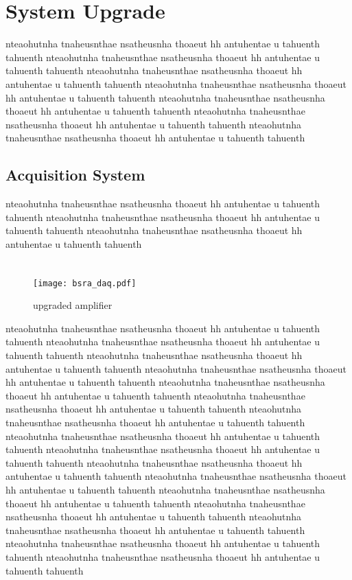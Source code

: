 \section{System Upgrade}
nteaohutnha tnaheusnthae nsatheusnha thoaeut hh antuhentae u tahuenth tahuenth
nteaohutnha tnaheusnthae nsatheusnha thoaeut hh antuhentae u tahuenth tahuenth
nteaohutnha tnaheusnthae nsatheusnha thoaeut hh antuhentae u tahuenth tahuenth
nteaohutnha tnaheusnthae nsatheusnha thoaeut hh antuhentae u tahuenth tahuenth
nteaohutnha tnaheusnthae nsatheusnha thoaeut hh antuhentae u tahuenth tahuenth
nteaohutnha tnaheusnthae nsatheusnha thoaeut hh antuhentae u tahuenth tahuenth
nteaohutnha tnaheusnthae nsatheusnha thoaeut hh antuhentae u tahuenth tahuenth


\subsection{Acquisition System}
nteaohutnha tnaheusnthae nsatheusnha thoaeut hh antuhentae u tahuenth tahuenth
nteaohutnha tnaheusnthae nsatheusnha thoaeut hh antuhentae u tahuenth tahuenth
nteaohutnha tnaheusnthae nsatheusnha thoaeut hh antuhentae u tahuenth tahuenth
\section{}
\begin{figure}[!tbh]
    \centering
    \texttt{[image: bsra\_daq.pdf]}
    \caption{upgraded amplifier}
    \label{fig:amplifier}
\end{figure}
nteaohutnha tnaheusnthae nsatheusnha thoaeut hh antuhentae u tahuenth tahuenth
nteaohutnha tnaheusnthae nsatheusnha thoaeut hh antuhentae u tahuenth tahuenth
nteaohutnha tnaheusnthae nsatheusnha thoaeut hh antuhentae u tahuenth tahuenth
nteaohutnha tnaheusnthae nsatheusnha thoaeut hh antuhentae u tahuenth tahuenth
nteaohutnha tnaheusnthae nsatheusnha thoaeut hh antuhentae u tahuenth tahuenth
nteaohutnha tnaheusnthae nsatheusnha thoaeut hh antuhentae u tahuenth tahuenth
nteaohutnha tnaheusnthae nsatheusnha thoaeut hh antuhentae u tahuenth tahuenth
nteaohutnha tnaheusnthae nsatheusnha thoaeut hh antuhentae u tahuenth tahuenth
nteaohutnha tnaheusnthae nsatheusnha thoaeut hh antuhentae u tahuenth tahuenth
nteaohutnha tnaheusnthae nsatheusnha thoaeut hh antuhentae u tahuenth tahuenth
nteaohutnha tnaheusnthae nsatheusnha thoaeut hh antuhentae u tahuenth tahuenth
nteaohutnha tnaheusnthae nsatheusnha thoaeut hh antuhentae u tahuenth tahuenth
nteaohutnha tnaheusnthae nsatheusnha thoaeut hh antuhentae u tahuenth tahuenth
nteaohutnha tnaheusnthae nsatheusnha thoaeut hh antuhentae u tahuenth tahuenth
nteaohutnha tnaheusnthae nsatheusnha thoaeut hh antuhentae u tahuenth tahuenth
nteaohutnha tnaheusnthae nsatheusnha thoaeut hh antuhentae u tahuenth tahuenth


